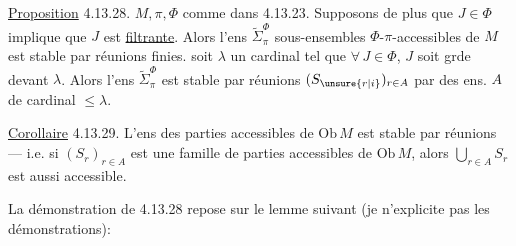 \uline{Proposition} 4.13.28.  $M,\pi,\Phi$ comme dans  4.13.23. Supposons de plus que \deleted{\unsure{$\Phi$}} $J\in\Phi$ implique que $J$ est \uline{filtrante}. Alors l'ens $\widetilde{\Sigma}_{\pi}^{\Phi}$  sous-ensembles $\Phi$-$\pi$-accessibles de $M$ est stable par  réunions finies.   soit $\lambda$ un cardinal \inserted{$<\pi$} tel que \deleted{\unsure{$\Phi$}} $\forall\,J\in\Phi$, $J$ soit grde devant $\lambda$. Alors l'ens $\widetilde{\Sigma}_{\pi}^{\Phi}$ est stable par réunions  $(S_{\unsure{r|i}})_{r\in A}$  par des ens. $A$ de cardinal $\leq\lambda$.

\uline{Corollaire} 4.13.29. L'ens des parties accessibles de $\mathrm{Ob}\,M$ est stable par  réunions --- i.e. si $(S_r)_{r\in A}$ est une  famille de parties accessibles de $\mathrm{Ob}\,M$, alors $\bigcup_{r\in A}S_r$ est aussi accessible.

La démonstration de 4.13.28 repose sur le lemme suivant (je n'explicite pas les démonstrations):
